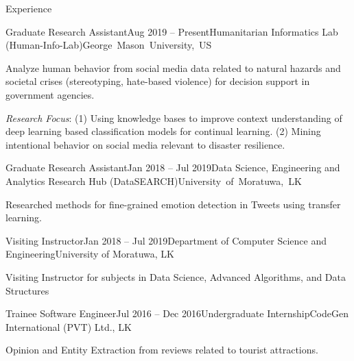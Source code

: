 \documentclass{resume} %
\begin{document}
\vspace{-0.1in}

\begin{rSection}{Experience}

    \begin{rSubsection}{Graduate Research Assistant}{Aug 2019 -- Present}{Humanitarian Informatics Lab (Human-Info-Lab)}{George~Mason~University,~US}
        \item Analyze human behavior from social media data related to natural hazards and societal crises (stereotyping, hate-based violence) for decision support in government agencies.
        \item \textit{Research Focus}: (1) Using knowledge bases to improve context understanding of deep learning based classification models for continual learning. (2) Mining intentional behavior on social media relevant to disaster resilience.
    \end{rSubsection}


    \begin{rSubsection}{Graduate Research Assistant}{Jan 2018 -- Jul 2019}{Data Science, Engineering and Analytics Research Hub (DataSEARCH)}{University~of~Moratuwa,~LK}
        \item Researched methods for fine-grained emotion detection in Tweets using transfer learning.
    \end{rSubsection}

    \begin{rSubsection}{Visiting Instructor}{Jan 2018 -- Jul 2019}{Department of Computer Science and Engineering}{University of Moratuwa, LK}
        \item Visiting Instructor for subjects in Data Science, Advanced Algorithms, and Data Structures
    \end{rSubsection}

    \begin{rSubsection}{Trainee Software Engineer}{Jul 2016 -- Dec 2016}{Undergraduate Internship}{CodeGen International (PVT) Ltd., LK}
        \item Opinion and Entity Extraction from reviews related to tourist attractions.
    \end{rSubsection}

\end{rSection}
\end{document}
